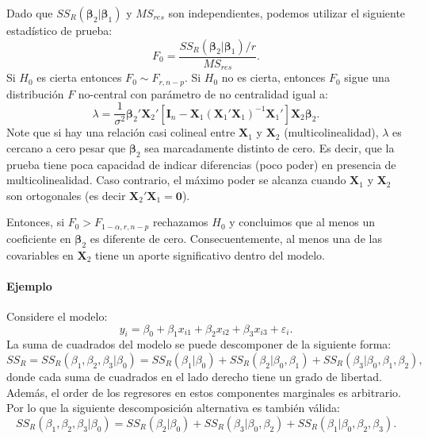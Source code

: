 \documentclass[
]{article}
\begin{document}
Dado que \(SS_{R}(\boldsymbol \beta_{2}| \boldsymbol \beta_{1})\) y \(MS_{res}\) son independientes, podemos utilizar el siguiente estadístico de prueba:
\[
F_{0} = \frac{SS_{R}(\boldsymbol \beta_{2}|\boldsymbol \beta_{1})/r}{MS_{res}}.
\]
Si \(H_{0}\) es cierta entonces \(F_{0} \sim F_{r,n-p}\). Si \(H_{0}\) no es cierta, entonces \(F_{0}\) sigue una distribución \(F\) no-central con parámetro de no centralidad igual a:
\[
\lambda = \frac{1}{\sigma^{2}}\boldsymbol \beta_{2}'\boldsymbol X_{2}'\left[ \boldsymbol I_{n} - \boldsymbol X_{1}(\boldsymbol X_{1}'\boldsymbol X_{1})^{-1}\boldsymbol X_{1}'\right]\boldsymbol X_{2}\boldsymbol \beta_{2}.
\]
Note que si hay una relación casi colineal entre \(\boldsymbol X_{1}\) y \(\boldsymbol X_{2}\) (multicolinealidad), \(\lambda\) es cercano a cero pesar que \(\boldsymbol \beta_{2}\) sea marcadamente distinto de cero. Es decir, que la prueba tiene poca capacidad de indicar diferencias (poco poder) en presencia de multicolinealidad. Caso contrario, el máximo poder se alcanza cuando \(\boldsymbol X_{1}\) y \(\boldsymbol X_{2}\) son ortogonales (es decir \(\boldsymbol X_{2}'\boldsymbol X_{1} = \boldsymbol 0\)).

Entonces, si \(F_{0} > F_{1-\alpha,r,n-p}\) rechazamos \(H_{0}\) y concluimos que al menos un coeficiente en \(\boldsymbol \beta_{2}\) es diferente de cero. Consecuentemente, al menos una de las covariables en \(\boldsymbol X_{2}\) tiene un aporte significativo dentro del modelo.

\hypertarget{ejemplo}{%
\paragraph*{Ejemplo}\label{ejemplo}}

Considere el modelo:
\[
y_{i} = \beta_{0} + \beta_{1}x_{i1} + \beta_{2}x_{i2} + \beta_{3}x_{i3} + \varepsilon_{i}.
\]
La suma de cuadrados del modelo se puede descomponer de la siguiente forma:
\[
SS_{R}=SS_{R}(\beta_{1},\beta_{2},\beta_{3}| \beta_{0}) = SS_{R}(\beta_{1}|\beta_{0}) + SS_{R}(\beta_{2}|\beta_{0},\beta_{1}) + SS_{R}(\beta_{3}|\beta_{0},\beta_{1},\beta_{2}),
\]
donde cada suma de cuadrados en el lado derecho tiene un grado de libertad. Además, el order de los regresores en estos componentes marginales es arbitrario. Por lo que la siguiente descomposición alternativa es también válida:
\[
SS_{R}(\beta_{1},\beta_{2},\beta_{3}| \beta_{0})=SS_{R}(\beta_{2}|\beta_{0}) + SS_{R}(\beta_{3}|\beta_{0},\beta_{2}) + SS_{R}(\beta_{1}|\beta_{0},\beta_{2},\beta_{3}).
\]
\end{document}
